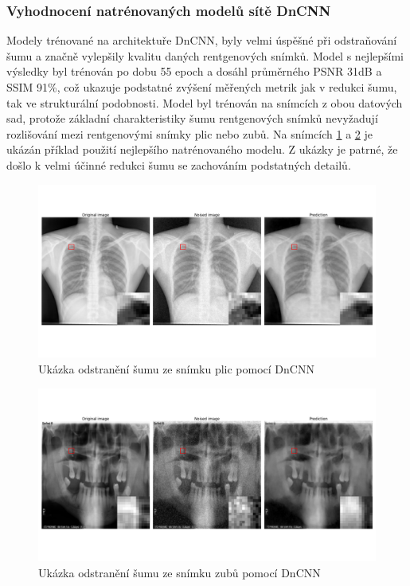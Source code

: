 \documentclass[male,czech,api_ing]{thesis}
\begin{document}
\subsubsection{Vyhodnocení natrénovaných modelů sítě DnCNN}
Modely trénované na architektuře DnCNN, byly velmi úspěšné při odstraňování šumu a značně vylepšily kvalitu daných rentgenových snímků. Model s nejlepšími výsledky byl trénován po dobu 55 epoch a dosáhl průměrného PSNR 31dB a SSIM 91\%, což ukazuje podstatné zvýšení měřených metrik jak v redukci šumu, tak ve strukturální podobnosti. Model byl trénován na snímcích z obou datových sad, protože základní charakteristiky šumu rentgenových snímků nevyžadují rozlišování mezi rentgenovými snímky plic nebo zubů. Na snímcích \ref{fig:DnCNN_lungs} a \ref{fig:DnCNN_teeth} je ukázán příklad použití nejlepšího natrénovaného modelu. Z ukázky je patrné, že došlo k velmi účinné redukci šumu se zachováním podstatných detailů.

\begin{figure}[h]
    \centering
    \includegraphics[width=\linewidth]{Prilohy/Obrazky/DnCNN_lungs.png}
    \caption{Ukázka odstranění šumu ze snímku plic pomocí DnCNN}
    \label{fig:DnCNN_lungs}
\end{figure}

\begin{figure}[h]
    \centering
    \includegraphics[width=\linewidth]{Prilohy/Obrazky/DnCNN_teeth.png}
    \caption{Ukázka odstranění šumu ze snímku zubů pomocí DnCNN}
    \label{fig:DnCNN_teeth}
\end{figure}
\end{document}
